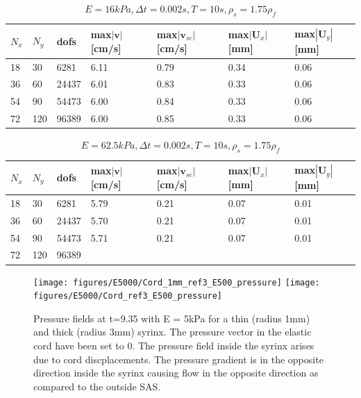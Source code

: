 \begin{table}[!h]
\begin{center}
  \begin{tabular}{l | l | l | l | l | l | l }
    $N_x$ & $N_y$ & dofs & max$|\mathbf{v}|$[cm/s] & max$|\mathbf{v}_{sc}|$[cm/s] & max$|\mathbf{U}_x|$[mm] & max$|\mathbf{U}_y|$[mm] \\ \hline
    18  & 30 & 6281 & 6.11 & 0.79 & 0.34 & 0.06 \\ \hline
	36 & 60 & 24437 & 6.01 & 0.83 & 0.33 & 0.06 \\ \hline
	54 & 90 & 54473 & 6.00 & 0.84 & 0.33 & 0.06 \\ \hline
	72 & 120& 96389 & 6.00 & 0.85 & 0.33 & 0.06 \\ \hline
    \hline
  \end{tabular}
  \end{center}
  \caption{$E = 16 kPa, \Delta t = 0.002s, T = 10s, \rho_s = 1.75 \rho_f$}
\end{table}
\begin{table}[!h]
\begin{center}
  \begin{tabular}{l | l | l | l | l | l | l }
    $N_x$ & $N_y$ & dofs & max$|\mathbf{v}|$[cm/s] & max$|\mathbf{v}_{sc}|$[cm/s] & max$|\mathbf{U}_x|$[mm] & max$|\mathbf{U}_y|$[mm] \\ \hline
    18  & 30 & 6281 & 5.79 & 0.21 & 0.07 & 0.01 \\ \hline
	36 & 60 & 24437 & 5.70 & 0.21 & 0.07 & 0.01 \\ \hline
	54 & 90 & 54473 & 5.71 & 0.21 & 0.07 & 0.01 \\ \hline
	72 & 120& 96389 &  &  &  &  \\ \hline
    \hline
  \end{tabular}
  \end{center}
  \caption{$E = 62.5 kPa, \Delta t = 0.002s, T = 10s, \rho_s = 1.75 \rho_f$}
\end{table}

\begin{center}
\begin{figure}[!h]
\texttt{[image: figures/E5000/Cord\_1mm\_ref3\_E500\_pressure]}
\texttt{[image: figures/E5000/Cord\_ref3\_E500\_pressure]}
\caption{Pressure fields at t=9.35 with E = 5kPa for a thin (radius 1mm) and thick (radius 3mm) syrinx. The pressure vector in the elastic cord have been set to 0. The pressure field inside the syrinx arises due to cord discplacements. The pressure gradient is in the opposite direction inside the syrinx causing flow in the opposite direction as compared to the outside SAS.}\label{fig:Cord_pressure}
\end{figure}
\end{center}
\clearpage
